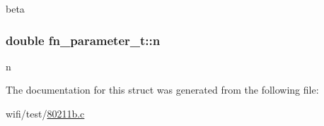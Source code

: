 beta 

\subsubsection[{\texorpdfstring{n}{n}}]{\setlength{\rightskip}{0pt plus 5cm}double fn\+\_\+parameter\+\_\+t\+::n}\hypertarget{structfn__parameter__t_a97f3cf570c3963f3a08dedf71fedee5c}{}\label{structfn__parameter__t_a97f3cf570c3963f3a08dedf71fedee5c}


n 



The documentation for this struct was generated from the following file\+:\begin{DoxyCompactItemize}
\item 
wifi/test/\hyperlink{80211b_8c}{80211b.\+c}\end{DoxyCompactItemize}
